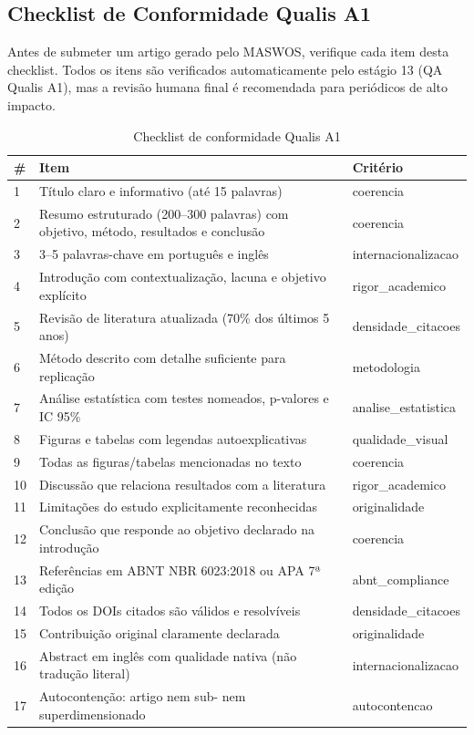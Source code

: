\subsection{Checklist de Conformidade Qualis A1}
\label{sec:checklist-qualis}

Antes de submeter um artigo gerado pelo MASWOS, verifique cada item desta checklist. Todos os itens são verificados automaticamente pelo estágio 13 (QA Qualis A1), mas a revisão humana final é recomendada para periódicos de alto impacto.

\begin{table}[H]
\centering
\caption{Checklist de conformidade Qualis A1}
\label{tab:checklist-qualis}
\begin{tabular}{@{}lp{8cm}l@{}}
\toprule
\textbf{\#} & \textbf{Item} & \textbf{Critério} \\
\midrule
1 & Título claro e informativo (até 15 palavras) & coerencia \\
2 & Resumo estruturado (200--300 palavras) com objetivo, método, resultados e conclusão & coerencia \\
3 & 3--5 palavras-chave em português e inglês & internacionalizacao \\
4 & Introdução com contextualização, lacuna e objetivo explícito & rigor\_academico \\
5 & Revisão de literatura atualizada (70\% dos últimos 5 anos) & densidade\_citacoes \\
6 & Método descrito com detalhe suficiente para replicação & metodologia \\
7 & Análise estatística com testes nomeados, p-valores e IC 95\% & analise\_estatistica \\
8 & Figuras e tabelas com legendas autoexplicativas & qualidade\_visual \\
9 & Todas as figuras/tabelas mencionadas no texto & coerencia \\
10 & Discussão que relaciona resultados com a literatura & rigor\_academico \\
11 & Limitações do estudo explicitamente reconhecidas & originalidade \\
12 & Conclusão que responde ao objetivo declarado na introdução & coerencia \\
13 & Referências em ABNT NBR 6023:2018 ou APA 7ª edição & abnt\_compliance \\
14 & Todos os DOIs citados são válidos e resolvíveis & densidade\_citacoes \\
15 & Contribuição original claramente declarada & originalidade \\
16 & Abstract em inglês com qualidade nativa (não tradução literal) & internacionalizacao \\
17 & Autocontenção: artigo nem sub- nem superdimensionado & autocontencao \\
\bottomrule
\end{tabular}
\end{table}

